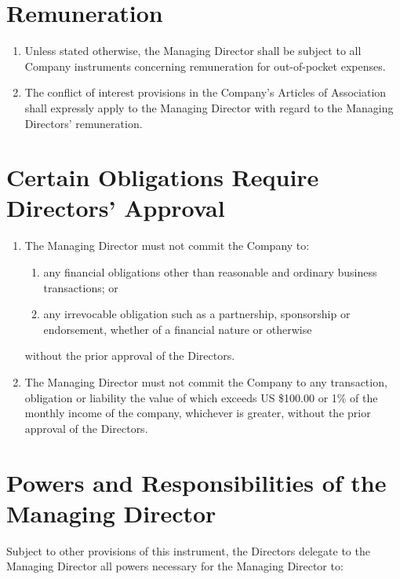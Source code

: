 \documentclass[a4paper,10pt]{article}
\begin{document}
\section{Remuneration}

\begin{enumerate}
    \item Unless stated otherwise, the Managing Director shall be subject to all Company instruments concerning remuneration for out-of-pocket expenses.
    \item The conflict of interest provisions in the Company's Articles of Association shall expressly apply to the Managing Director with regard to the Managing Directors' remuneration.
\end{enumerate}

\section{Certain Obligations Require Directors' Approval}

\begin{enumerate}
    \item The Managing Director must not commit the Company to:
    \begin{enumerate}
        \item any financial obligations other than reasonable and ordinary business transactions; or
        \item any irrevocable obligation such as a partnership, sponsorship or endorsement, whether of a financial nature or otherwise
    \end{enumerate}
        without the prior approval of the Directors.
    \item The Managing Director must not commit the Company to any transaction, obligation or liability the value of which exceeds US \$100.00 or 1\% of the monthly income of the company, whichever is greater, without the prior approval of the Directors.
\end{enumerate}

\setcounter{section}{0}

\renewcommand{\thesection}{Schedule \arabic{section}}

\section{Powers and Responsibilities of the Managing Director}

Subject to other provisions of this instrument, the Directors delegate to the Managing Director all powers necessary for the Managing Director to:
\end{document}
